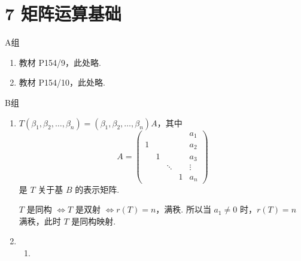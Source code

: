 \section*{7 矩阵运算基础}

\vspace{2ex}

\centerline{\heiti A组}
\begin{enumerate}
    \item 教材 P154/9，此处略.
    \item 教材 P154/10，此处略.
\end{enumerate}

\centerline{\heiti B组}
\begin{enumerate}
    \item $ T(\beta_1, \beta_2, \ldots, \beta_n) = (\beta_1, \beta_2, \ldots, \beta_n)A $，其中
          \[ A = \begin{pmatrix}
                    &   &        &   & a_1    \\
                  1 &   &        &   & a_2    \\
                    & 1 &        &   & a_3    \\
                    &   & \ddots &   & \vdots \\
                    &   &        & 1 & a_n
              \end{pmatrix} \]
          是 $ T $ 关于基 $ B $ 的表示矩阵.

          $ T $ 是同构 $ \iff T $ 是双射 $ \iff r(T) = n $，满秩. 所以当 $ a_1 \neq 0 $ 时，$ r(T) = n $ 满秩，此时 $ T $ 是同构映射.

    \item \begin{enumerate}
              \item


\end{enumerate}
\end{enumerate}
